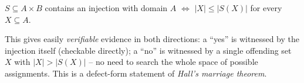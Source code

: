 \bigskip
\begin{corollary}[CN Cor. 22]
$S \subseteq A\times B$ contains an injection with domain $A$ $\iff$ $|X|\le|S(X)|$ for every $X\subseteq A$.
\end{corollary}

\begin{note}
This gives easily \emph{verifiable} evidence in both directions: a ``yes'' is witnessed by the injection itself (checkable directly); a ``no'' is witnessed by a single offending set $X$ with $|X|>|S(X)|$ -- no need to search the whole space of possible assignments. This is a defect-form statement of \emph{Hall's marriage theorem}.
\end{note}

